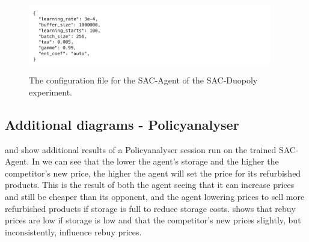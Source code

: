 \begin{figure}[ht]
	\includegraphics[width = 0.95\textwidth]{images/configs/SACDuopoly/SACDuopolyAgent.png}\\
	\caption{The configuration file for the SAC-Agent of the SAC-Duopoly experiment.}\label{fig:SACDuopolyConfigAgent}
\end{figure}

\clearpage
\subsection{Additional diagrams - Policyanalyser}\label{subsec:AppendixSACDuopolyPolicyanalyser}

 and  show additional results of a Policyanalyser session run on the trained SAC-Agent. In  we can see that the lower the agent's storage and the higher the competitor's new price, the higher the agent will set the price for its refurbished products. This is the result of both the agent seeing that it can increase prices and still be cheaper than its opponent, and the agent lowering prices to sell more refurbished products if storage is full to reduce storage costs.  shows that rebuy prices are low if storage is low and that the competitor's new prices slightly, but inconsistently, influence rebuy prices.


